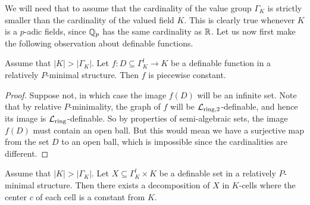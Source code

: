 We will need that to assume that the cardinality of the value group $\Gamma_K$ is strictly smaller than the cardinality of the valued field $K$. This is clearly true whenever $K$ is a $p$-adic fields, since ${{\mathbb Q}}_p$ has the same cardinality as ${{\mathbb R}}$.
Let us now first make the following observation about definable functions.
\begin{lem}\label{lem:constant} Assume that $|K| > |\Gamma_K|$.
Let $f: D\subseteq \Gamma_K^l \to K$ be a definable function in a relatively $P$-minimal structure. Then $f$ is piecewise constant.
\end{lem}
\begin{proof} 
Suppose not, in which case the image $f(D)$ will be an infinite set. Note that by relative $P$-minimality, the graph of $f$ will be $\mathcal{L}_{\text{ring,2}}$-definable, and hence its image is $\mathcal{L}_{\text{ring}}$-definable. So by properties of semi-algebraic sets, the image $f(D)$ must contain an open ball. But this would mean we have a surjective map from the  set $D$ to an open ball, which is impossible since the cardinalities are different.
\end{proof}
\begin{lem} Assume that $|K| > |\Gamma_K|$.
Let $X \subseteq \Gamma_K^l \times K$ be a definable set in a relatively $P$-minimal structure. Then there exists 
a decomposition of $X$ in $K$-cells where the center $c$ of each cell is a constant from $K$.
\end{lem}
